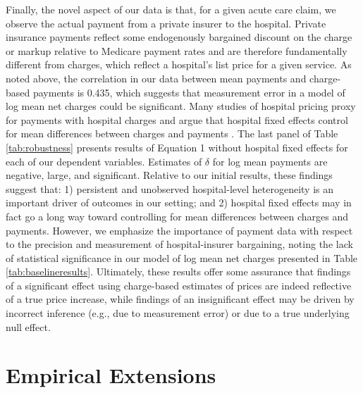 \documentclass[12pt]{article}
\begin{document}
Finally, the novel aspect of our data is that, for a given acute care claim, we observe the actual payment from a private insurer to the hospital. Private insurance payments reflect some endogenously bargained discount on the charge or markup relative to Medicare payment rates and are therefore fundamentally different from charges, which reflect a hospital's list price for a given service. As noted above, the correlation in our data between mean payments and charge-based payments is 0.435, which suggests that measurement error in a model of log mean net charges could be significant. Many studies of hospital pricing proxy for payments with hospital charges and argue that hospital fixed effects control for mean differences between charges and payments \citep{cutler2000}. The last panel of Table \ref{tab:robustness} presents results of Equation 1 without hospital fixed effects for each of our dependent variables.  Estimates of $\delta$ for log mean payments are negative, large, and significant. Relative to our initial results, these findings suggest that: 1) persistent and unobserved hospital-level heterogeneity is an important driver of outcomes in our setting; and 2) hospital fixed effects may in fact go a long way toward controlling for mean differences between charges and payments. However, we emphasize the importance of payment data with respect to the precision and measurement of hospital-insurer bargaining, noting the lack of statistical significance in our model of log mean net charges presented in Table \ref{tab:baselineresults}. Ultimately, these results offer some assurance that findings of a significant effect using charge-based estimates of prices are indeed reflective of a true price increase, while findings of an insignificant effect may be driven by incorrect inference (e.g., due to measurement error) or due to a true underlying null effect.

\section{Empirical Extensions}
\label{sec:Ext}
\end{document}
